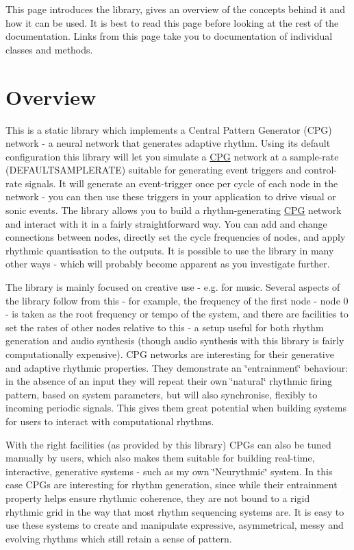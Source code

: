 This page introduces the library, gives an overview of the concepts behind it and how it can be used. It is best to read this page before looking at the rest of the documentation. Links from this page take you to documentation of individual classes and methods.

\section*{Overview}

This is a static library which implements a Central Pattern Generator (C\+PG) network -\/ a neural network that generates adaptive rhythm. Using its default configuration this library will let you simulate a \hyperlink{classCPG}{C\+PG} network at a sample-\/rate (D\+E\+F\+A\+U\+L\+T\+S\+A\+M\+P\+L\+E\+R\+A\+TE) suitable for generating event triggers and control-\/rate signals. It will generate an event-\/trigger once per cycle of each node in the network -\/ you can then use these triggers in your application to drive visual or sonic events. The library allows you to build a rhythm-\/generating \hyperlink{classCPG}{C\+PG} network and interact with it in a fairly straightforward way. You can add and change connections between nodes, directly set the cycle frequencies of nodes, and apply rhythmic quantisation to the outputs. It is possible to use the library in many other ways -\/ which will probably become apparent as you investigate further.

The library is mainly focused on creative use -\/ e.\+g. for music. Several aspects of the library follow from this -\/ for example, the frequency of the first node -\/ node 0 -\/ is taken as the root frequency or tempo of the system, and there are facilities to set the rates of other nodes relative to this -\/ a setup useful for both rhythm generation and audio synthesis (though audio synthesis with this library is fairly computationally expensive). C\+PG networks are interesting for their generative and adaptive rhythmic properties. They demonstrate an \char`\"{}entrainment\char`\"{} behaviour\+: in the absence of an input they will repeat their own \char`\"{}natural\char`\"{} rhythmic firing pattern, based on system parameters, but will also synchronise, flexibly to incoming periodic signals. This gives them great potential when building systems for users to interact with computational rhythms.

With the right facilities (as provided by this library) C\+P\+Gs can also be tuned manually by users, which also makes them suitable for building real-\/time, interactive, generative systems -\/ such as my own \char`\"{}\+Neurythmic\char`\"{} system. In this case C\+P\+Gs are interesting for rhythm generation, since while their entrainment property helps ensure rhythmic coherence, they are not bound to a rigid rhythmic grid in the way that most rhythm sequencing systems are. It is easy to use these systems to create and manipulate expressive, asymmetrical, messy and evolving rhythms which still retain a sense of pattern.


